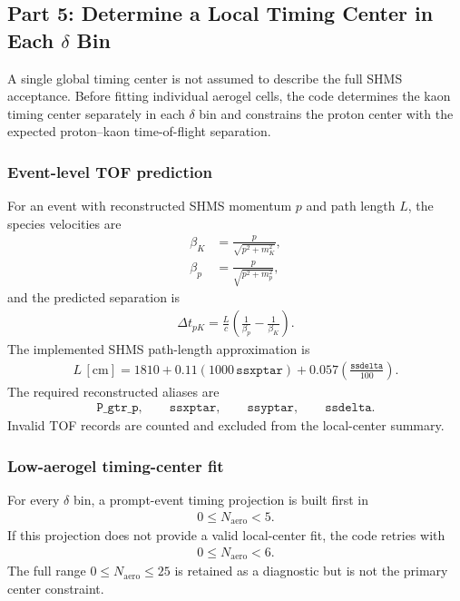 \documentclass[11pt]{article}
\begin{document}
\subsection{Part 5: Determine a Local Timing Center in Each $\delta$ Bin}

A single global timing center is not assumed to describe the full SHMS
acceptance.  Before fitting individual aerogel cells, the code determines the
kaon timing center separately in each $\delta$ bin and constrains the proton
center with the expected proton--kaon time-of-flight separation.

\subsubsection*{Event-level TOF prediction}

For an event with reconstructed SHMS momentum $p$ and path length $L$, the
species velocities are
\begin{align}
  \beta_K &= \frac{p}{\sqrt{p^2+m_K^2}},\\
  \beta_p &= \frac{p}{\sqrt{p^2+m_p^2}},
\end{align}
and the predicted separation is
\begin{align}
  \Delta t_{pK}
  =\frac{L}{c}
    \left(\frac{1}{\beta_p}-\frac{1}{\beta_K}\right).
\end{align}
The implemented SHMS path-length approximation is
\begin{align}
  L\,[\mathrm{cm}]
  =1810
   +0.11\left(1000\,\texttt{ssxptar}\right)
   +0.057\left(\frac{\texttt{ssdelta}}{100}\right).
\end{align}
The required reconstructed aliases are
\begin{align}
  \texttt{P\_gtr\_p},\qquad
  \texttt{ssxptar},\qquad
  \texttt{ssyptar},\qquad
  \texttt{ssdelta}.
\end{align}
Invalid TOF records are counted and excluded from the local-center summary.

\subsubsection*{Low-aerogel timing-center fit}

For every $\delta$ bin, a prompt-event timing projection is built first in
\begin{align}
  0\leq N_{\mathrm{aero}}<5.
\end{align}
If this projection does not provide a valid local-center fit, the code retries
with
\begin{align}
  0\leq N_{\mathrm{aero}}<6.
\end{align}
The full range $0\leq N_{\mathrm{aero}}\leq25$ is retained as a diagnostic but
is not the primary center constraint.
\end{document}
